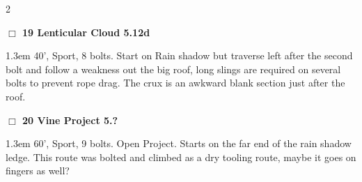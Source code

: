 \begin{multicols}{2}
\needspace{2em}
\label{rt:Lenticular Cloud}
\colorbox{Goldenrod!20}{
\parbox{0.95\linewidth}{
\hspace{-1ex}\textbf{$\Box$
19 Lenticular Cloud 5.12d  
}}}
\begin{adjustwidth}{1.3em}{}			
40', Sport, 8 bolts. Start on Rain shadow but traverse left after the second bolt and follow a weakness out the big roof, long slings are required on several bolts to prevent rope drag. The crux is an awkward blank section just after the roof.
\end{adjustwidth}
\needspace{2em}
\label{rt:Vine Project}
\colorbox{black!20}{
\parbox{0.95\linewidth}{
\hspace{-1ex}\textbf{$\Box$
20 Vine Project 5.?  
}}}
\begin{adjustwidth}{1.3em}{}			
60', Sport, 9 bolts. Open Project. Starts on the far end of the rain shadow ledge. This route was bolted and climbed as a dry tooling route, maybe it goes on fingers as well?
\end{adjustwidth}
\needspace{10em}

\end{multicols}
